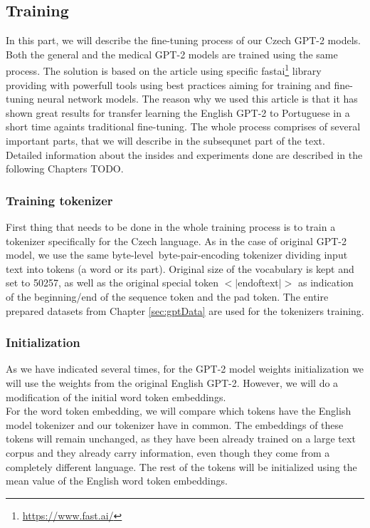 \subsection{Training}
In this part, we will describe the fine-tuning process of our Czech GPT-2 models. Both the general and the medical GPT-2 models are trained using the same process. The solution is based on the \citet{guillou2020faster} article using specific fastai\footnote[6]{\url{https://www.fast.ai/}} library providing with powerfull tools using best practices aiming for training and fine-tuning neural network models. The reason why we used this article is that it has shown great results for transfer learning the English GPT-2 to Portuguese in a short time againts traditional fine-tuning. The whole process comprises of several important parts, that we will describe in the subsequnet part of the text. Detailed information about the insides and experiments done are described in the following Chapters TODO.

\subsubsection*{Training tokenizer}
First thing that needs to be done in the whole training process is to train a tokenizer specifically for the Czech language. As in the case of original GPT-2 model, we use the same byte-level~byte-pair-encoding\citep{sennrich2015neural} tokenizer dividing input text into tokens (a word or its part). Original size of the vocabulary is kept and set to 50257, as well as the original special token $<|$endoftext$|>$ as indication of the beginning/end of the sequence token and the pad token. The entire prepared datasets from Chapter \ref{sec:gptData} are used for the tokenizers training.

\subsubsection*{Initialization}
As we have indicated several times, for the GPT-2 model weights initialization we will use the weights from the original English GPT-2. However, we will do a modification of the initial word token embeddings.\\

For the word token embedding, we will compare which tokens have the English model tokenizer and our tokenizer have in common. The embeddings of these tokens will remain unchanged, as they have been already trained on a large text corpus and they already carry information, even though they come from a completely different language. The rest of the tokens will be initialized using the mean value of the English word token embeddings.

